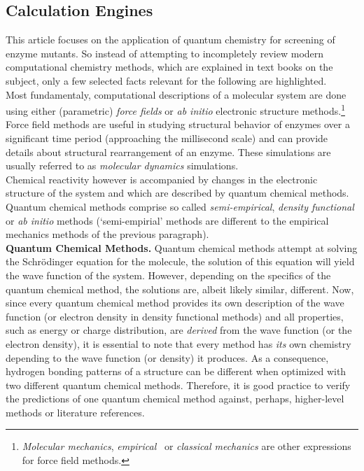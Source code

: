 \subsection{Calculation Engines}\label{sec:calculation_engines}
This article focuses on the application of quantum chemistry for screening of enzyme mutants.
So instead of attempting to incompletely review modern computational chemistry methods, which are explained in text books on the subject\cite{young2004computational, jensen2007introduction, cramer2013essentials}, only a few selected facts relevant for the following are highlighted.\\
Most fundamentaly, computational descriptions of a molecular system are done using either (parametric) \textit{force fields} or \textit{ab initio} electronic structure methods.\footnote{\textit{Molecular mechanics}, \textit{empirical } or \textit{classical mechanics} are other expressions for force field methods.}
Force field methods are useful in studying structural behavior of enzymes over a significant time period (approaching the millisecond scale) and can provide details about structural rearrangement of an enzyme.
These simulations are usually referred to as \textit{molecular dynamics} simulations.\\
Chemical reactivity however is accompanied by changes in the electronic structure of the system and which are described by quantum chemical methods.
Quantum chemical methods comprise so called \textit{semi-empirical}, \textit{density functional } or \textit{ab initio} methods (`semi-empirial' methods are different to the empirical mechanics methods of the previous paragraph).\\
\textbf{Quantum Chemical Methods.}
Quantum chemical methods attempt at solving the Schr{\"o}dinger equation for the molecule, the solution of this equation will yield the wave function of the system.
However, depending on the specifics of the quantum chemical method, the solutions are, albeit likely similar, different.
Now, since every quantum chemical method provides its own description of the wave function (or electron density in density functional methods) and all properties, such as energy or charge distribution, are \textit{derived} from the wave function (or the electron density), it is essential to note that every method has \textit{its} own chemistry depending to the wave function (or density) it produces.
As a consequence, hydrogen bonding patterns of a structure can be different when optimized with two different quantum chemical methods.
Therefore, it is good practice to verify the predictions of one quantum chemical method against, perhaps, higher-level methods or literature references.
